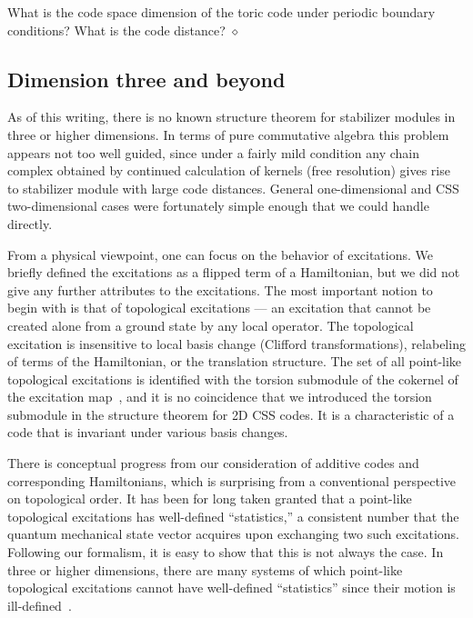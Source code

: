 \begin{exc}
What is the code space dimension of the toric code under periodic boundary conditions?
What is the code distance?
\hfill $\diamond$ \end{exc}


\subsection{Dimension three and beyond}

As of this writing, there is no known
structure theorem for stabilizer modules in three or higher dimensions.
In terms of pure commutative algebra this problem appears 
not too well guided, since under a fairly mild condition
any chain complex obtained by continued calculation of kernels
(free resolution) gives rise to stabilizer module with large code distances.
General one-dimensional and CSS two-dimensional cases 
were fortunately simple enough that we could handle directly.

From a physical viewpoint,
one can focus on the behavior of excitations.
We briefly defined the excitations as a flipped term of a Hamiltonian,
but we did not give any further attributes to the excitations.
The most important notion to begin with is that of topological excitations ---
an excitation that cannot be created alone from a ground state by any local operator.
The topological excitation is insensitive to local basis change (Clifford transformations),
relabeling of terms of the Hamiltonian, or the translation structure.
The set of all point-like topological excitations 
is identified with 
the torsion submodule of the cokernel of the excitation map~\cite{Haah2012PauliModule},
and it is no coincidence that we introduced the torsion submodule
in the structure theorem for 2D CSS codes.
It is a characteristic of a code that is invariant under various basis changes.

There is conceptual progress from our consideration of additive codes
and corresponding Hamiltonians,
which is surprising from a conventional perspective on topological order.
It has been for long taken granted that a point-like topological excitations
has well-defined ``statistics,''
a consistent number that the quantum mechanical state vector acquires
upon exchanging two such excitations.
Following our formalism,
it is easy to show that this is not always the case.
In three or higher dimensions, there are many systems
of which point-like topological excitations cannot have well-defined ``statistics''
since their motion
is ill-defined~\cite{Chamon2005Quantum,BravyiLeemhuisTerhal2011Topological,
Haah2011Local,VijayHaahFu2015New}.

